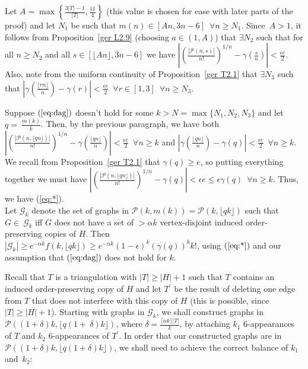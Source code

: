 \documentclass{article}
\newtheorem{Proof of Theorem}{Proof of Theorem}
\begin{document}
Let $A = \max \left \{ \frac{3|T|-1}{|T|}, \frac{11}{4} \right \}$
(this value is chosen for ease with later parts of the proof)
and let $N_{1}$ be such that $m(n) \in [An,3n-6]$~$\forall n \geq N_{1}$.
Since~$A>1$, 
it follows from Proposition~\ref{ger L2.9}
(choosing $a \in (1,A)$)
that $\exists N_{2}$ such that for all $n \geq N_{2}$ and all
$s \in [\lfloor An \rfloor, 3n-6]$ we have
$\left|\left(\frac{|\mathcal{P}(n,s)|}{n!} \right)^{1/n} - 
\gamma \left(\frac{s}{n} \right)\right| < \frac{\epsilon e}{2}$.
Also, note from the uniform continuity of
Proposition~\ref{ger T2.1}
that $\exists N_{3}$ such that
$\left|\gamma \left(\frac{\lfloor rn \rfloor}{n} \right)- \gamma (r)\right| <
\frac{\epsilon e}{2}$~$\forall r \in [1,3]$~$\forall n \geq N_{3}$.

Suppose $(\ref{eq:dag})$ doesn't hold for some $k \!>\! N \!=\! \max \{\! N_{1}, N_{2}, N_{3} \!\}$
and let~$q =~\!\!\frac{m(k)}{k}$.
Then, by the previous paragraph, we have both
$\left|\left(\frac{|\mathcal{P}(n, \lfloor qn \rfloor)|}{n!} \right)^{1/n} - 
\gamma \left( \frac {\lfloor qn \rfloor}{n} \right)\right| < \frac{\epsilon e}{2}$~$\forall n \geq k$
and
$\left|\gamma \left(\frac{\lfloor qn \rfloor}{n} \right)- \gamma (q)\right| < 
\frac{\epsilon e}{2} $~$\forall n \geq k$.
We recall from Proposition~\ref{ger T2.1} that 
$\gamma (q) \geq e$,
so putting everything together we must have 
$\left|\left(\frac{|\mathcal{P}(n, \lfloor qn \rfloor)|}{n!} \right)^{1/n} \!-\! \gamma (q)\right| < 
\epsilon e \leq \epsilon \gamma (q)$~$\forall n \geq k$.
Thus, we have (\ref{eq:*}).
\\

Let $\mathcal{G}_{k}$ denote the set of graphs in 
$\mathcal{P}(k,m(k)) = \mathcal{P}(k, \lfloor qk \rfloor)$
such that $G \in~\mathcal{G}_{k}$ iff 
$G$ does not have a set of $> \alpha k$ vertex-disjoint induced order-preserving copies of $H$.
Then $|\mathcal{G}_{k}| \geq e^{- \alpha k} f(k, \lfloor qk \rfloor) 
\geq e^{- \alpha k} (1 - \epsilon)^{k} (\gamma (q))^{k} k!$,
using $(\ref{eq:*})$ and our assumption that $(\ref{eq:dag})$ does not hold for $k$.

Recall that $T$ is a triangulation with $|T| \geq |H|+1$
such that $T$ contains an induced order-preserving copy of $H$
and let $T^{\prime}$ be the result of deleting one edge from $T$ that does not interfere with this copy of $H$
(this is possible, since $|T| \geq |H|+1$).
Starting with graphs in $\mathcal{G}_{k}$,
we shall construct graphs in $\mathcal{P}((1+\delta)k, \lfloor q(1+~\delta)k \rfloor)$,
where $\delta = \frac{ \lceil \alpha k \rceil |T| }{k}$,
by attaching $k_{1}$ $6$-appearances of $T$ and $k_{2}$ $6$-appearances of $T^{\prime}$.
In order that our constructed graphs are in 
$\mathcal{P}((1+\delta)k, \lfloor q(1+\delta)k \rfloor)$,
we shall need to achieve the correct balance of $k_{1}$ and~$k_{2}$: \\
\\
\end{document}
